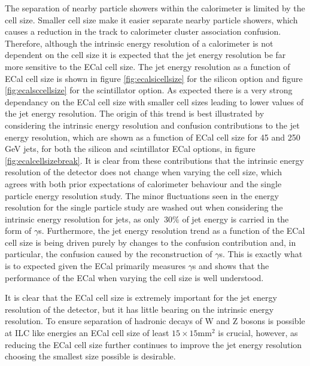 The separation of nearby particle showers within the calorimeter is limited by the cell size.  Smaller cell size make it easier separate nearby particle showers, which causes a reduction in the track to calorimeter cluster association confusion.  Therefore, although the intrinsic energy resolution of a calorimeter is not dependent on the cell size it is expected that the jet energy resolution be far more sensitive to the ECal cell size.  The jet energy resolution as a function of ECal cell size is shown in figure \ref{fig:ecalsicellsize} for the silicon option and figure \ref{fig:ecalsccellsize} for the scintillator option.  As expected there is a very strong dependancy on the ECal cell size with smaller cell sizes leading to lower values of the jet energy resolution.  The origin of this trend is best illustrated by considering the intrinsic energy resolution and confusion contributions to the jet energy resolution, which are shown as a function of ECal cell size for 45 and 250 GeV jets, for both the silicon and scintillator ECal options, in figure \ref{fig:ecalcellsizebreak}.  It is clear from these contributions that the intrinsic energy resolution of the detector does not change when varying the cell size, which agrees with both prior expectations of calorimeter behaviour and the single particle energy resolution study.  The minor fluctuations seen in the energy resolution for the single particle study are washed out when considering the intrinsic energy resolution for jets, as only $~30\%$ of jet energy is carried in the form of $\gamma$s.  Furthermore, the jet energy resolution trend as a function of the ECal cell size is being driven purely by changes to the confusion contribution and, in particular, the confusion caused by the reconstruction of $\gamma$s.  This is exactly what is to expected given the ECal primarily measures $\gamma$s and shows that the performance of the ECal when varying the cell size is well understood.

It is clear that the ECal cell size is extremely important for the jet energy resolution of the detector, but it has little bearing on the intrinsic energy resolution.  To ensure separation of hadronic decays of W and Z bosons is possible at ILC like energies an ECal cell size of least $15 \times 15 \text{mm}^{2}$ is crucial, however, as reducing the ECal cell size further continues to improve the jet energy resolution choosing the smallest size possible is desirable.   

